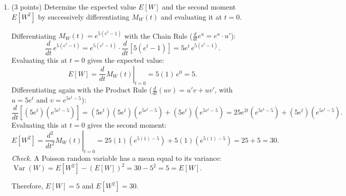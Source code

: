 \documentclass[letterpaper]{article}
\begin{document}
\begin{enumerate}[label=(\alph*), leftmargin=*]
    \item (3 points) Determine the expected value $E[W]$ and the second moment $E[W^2]$ by successively differentiating $M_W(t)$ and evaluating it at $t = 0$.

    Differentiating $M_W(t) = e^{5(e^t-1)}$ with the Chain Rule ($\frac{d}{dt} e^u = e^u \cdot u'$):
\[
    \frac{d}{dt}\,e^{5(e^t-1)} = e^{5(e^t-1)}\cdot\frac{d}{dt}\left[5(e^t-1)\right] = 5e^t\,e^{5(e^t-1)}.
\]
Evaluating this at $t = 0$ gives the expected value:
\[
    E[W] = \left.\frac{d}{dt}M_W(t)\right|_{t=0} = 5(1)\,e^{0} = 5.
\]
Differentiating again with the Product Rule ($\frac{d}{dt}(uv) = u'v + uv'$, with $u = 5e^t$ and $v = e^{5e^t - 5}$):
\[
    \frac{d}{dt}\left[\left(5e^t\right)\left(e^{5e^t - 5}\right)\right]
    = \left(5e^t\right)\left(5e^t\right)\left(e^{5e^t - 5}\right) + \left(5e^t\right)\left(e^{5e^t - 5}\right)
    = 25e^{2t}\left(e^{5e^t - 5}\right) + \left(5e^t\right)\left(e^{5e^t - 5}\right).
\]
Evaluating this at $t = 0$ gives the second moment:
\[
    E[W^2] = \left.\frac{d^2}{dt^2}M_W(t)\right|_{t=0} = 25(1)\left(e^{5(1) - 5}\right) + 5(1)\left(e^{5(1) - 5}\right) = 25 + 5 = 30.
\]
\textit{Check.} A Poisson random variable has a mean equal to its variance: $\operatorname{Var}(W) = E[W^2] - (E[W])^2 = 30 - 5^2 = 5 = E[W]$.

Therefore, $\boxed{E[W] = 5}$ and $\boxed{E[W^2] = 30}$.
\end{enumerate}
\end{document}
